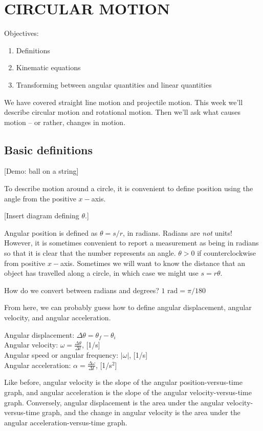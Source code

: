 \section{CIRCULAR MOTION}
Objectives:
\begin{enumerate}
\item Definitions
\item Kinematic equations
\item Transforming between angular quantities and linear quantities
\end{enumerate}

We have covered straight line motion and projectile motion. This week we'll describe circular motion and rotational motion. Then we'll ask what causes motion -- or rather, changes in motion.


\subsection*{Basic definitions}
[Demo: ball on a string]

To describe motion around a circle, it is convenient to define position using the angle from the positive $x-$axis.

[Insert diagram defining $\theta$.]
\vspace{5cm}

Angular position is defined as $\theta=s/r$, in radians. Radians are \textit{not} units! However, it is sometimes convenient to report a measurement as being in radians so that it is clear that the number represents an angle. $\theta>0$ if counterclockwise from positive $x-$axis. Sometimes we will want to know the distance that an object has travelled along a circle, in which case we might use $s=r\theta$.

How do we convert between radians and degrees? $1\mbox{ rad}=\pi/180$

From here, we can probably guess how to define angular displacement, angular velocity, and angular acceleration.

Angular displacement: $\Delta{\theta}=\theta_f-\theta_i$\\
Angular velocity: $\omega=\frac{\Delta\theta}{\Delta{t}}$, [1/s]\\
Angular speed or angular frequency: $|\omega|$, [1/s]\\
Angular acceleration: $\alpha=\frac{\Delta\omega}{\Delta{t}}$, [1/s$^2$]

Like before, angular velocity is the slope of the angular position-versus-time graph, and angular acceleration is the slope of the angular velocity-versus-time graph. Conversely, angular displacement is the area under the angular velocity-versus-time graph, and the change in angular velocity is the area under the angular acceleration-versus-time graph. 

